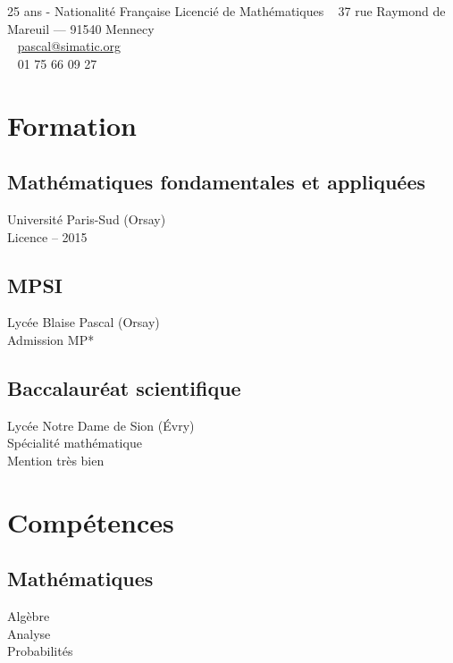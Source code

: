 \documentclass[]{cv-template}
\begin{document}
%
%
{25 ans - Nationalité Française}
{Licencié de Mathématiques}
{\faHome ~ 37 rue Raymond de Mareuil --- 91540 Mennecy \\
  \faEnvelope ~ \href{mailto:pascal@simatic.org}{pascal@simatic.org}\\
  \faPhone  ~  01 75 66 09 27}

%
%
\begin{minipage}[t]{0.34\textwidth} 

\section{Formation} 

\subsection{Mathématiques fondamentales \newline et appliquées}
\mycaret Université Paris-Sud (Orsay)\\
\mycaret Licence -- 2015
\sectionsep

\subsection{MPSI}
\mycaret Lycée Blaise Pascal (Orsay)\\
\mycaret Admission MP*
\sectionsep

\subsection{Baccalauréat scientifique}
\mycaret Lycée Notre Dame de Sion (\'Evry) \\
\mycaret Spécialité mathématique \\
\mycaret Mention très bien
\sectionsep

\section{Compétences}
\subsection{Mathématiques}
\mycaret Algèbre\\
\mycaret Analyse\\
\mycaret Probabilités\\
\sectionsep


\end{minipage}
\end{document}
